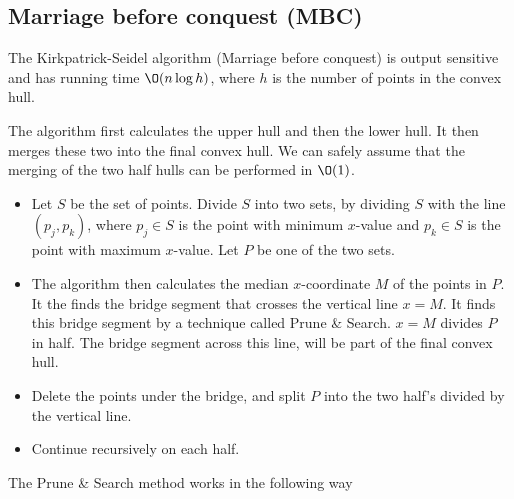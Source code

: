 \documentclass[10pt]{article}
\begin{document}

\subsection{Marriage before conquest (MBC)} %
\label{sub:marriage_before_conquest_mbc_}
The Kirkpatrick-Seidel algorithm (Marriage before conquest) is output sensitive and has running time $\O(n\log{h})$, where $h$ is the number of points in the convex hull.

The algorithm first calculates the upper hull and then the lower hull. It then merges these two into the final convex hull. We can safely assume that the merging of the two half hulls can be performed in $\O(1)$.

\begin{itemize}
  \item Let $S$ be the set of points. Divide $S$ into two sets, by dividing $S$ with the line $(p_j,p_k)$, where $p_j \in S$ is the point with minimum $x$-value and $p_k \in S$ is the point with maximum $x$-value. Let $P$ be one of the two sets.                                                                                                                                        
  \item The algorithm then calculates the median $x$-coordinate $M$ of the points in $P$. It the finds the bridge segment that crosses the vertical line $x=M$. It finds this bridge segment by a technique called Prune \& Search. $x=M$ divides $P$ in half. The bridge segment across this line, will be part of the final convex hull. 
  \item Delete the points under the bridge, and split $P$ into the two half's divided by the vertical line. 
  \item Continue recursively on each half.
\end{itemize}


The Prune \& Search method works in the following way
\end{document}
